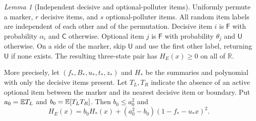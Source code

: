 \documentclass[11pt,a4paper]{article}
\theoremstyle{definition}\newtheorem{definition}[theorem]{Definition}
\theoremstyle{remark}\newtheorem{remark}[theorem]{Remark}
\newtheorem{xlemma}[xtheorem]{Lemma}
\theoremstyle{definition}\newtheorem{xexample}[xtheorem]{Example}\theoremstyle{plain}
\newcommand{\Fail}{\mathsf F}\newcommand{\Clean}{\mathsf C}\newcommand{\Und}{\mathsf U}
\begin{document}
\begin{xlemma}[Independent decisive and optional-polluter items]\label{x:lem:items}
Uniformly permute a marker, $r$ decisive items, and $s$ optional-polluter items. All random item labels are independent of each other and of the permutation. Decisive item $i$ is $\Fail$ with probability $\alpha_i$ and $\Clean$ otherwise. Optional item $j$ is $\Fail$ with probability $\theta_j$ and $\Und$ otherwise. On a side of the marker, skip $\Und$ and use the first other label, returning $\Und$ if none exists. The resulting three-state pair has $H_E(x)\ge0$ on all of $\mathbb R$.

More precisely, let $(f_*,B_*,u_*,t_*,z_*)$ and $H_*$ be the summaries and polynomial with only the decisive items present. Let $T_L,T_R$ indicate the absence of an active optional item between the marker and its nearest decisive item or boundary. Put $a_0=\mathbb E T_L$ and $b_0=\mathbb E[T_LT_R]$. Then $b_0\le a_0^2$ and
\begin{equation}\label{x:eq:items}
\boxed{H_E(x)=b_0H_*(x)+(a_0^2-b_0)(1-f_*-u_*x)^2.}
\end{equation}
\end{xlemma}
\end{document}
